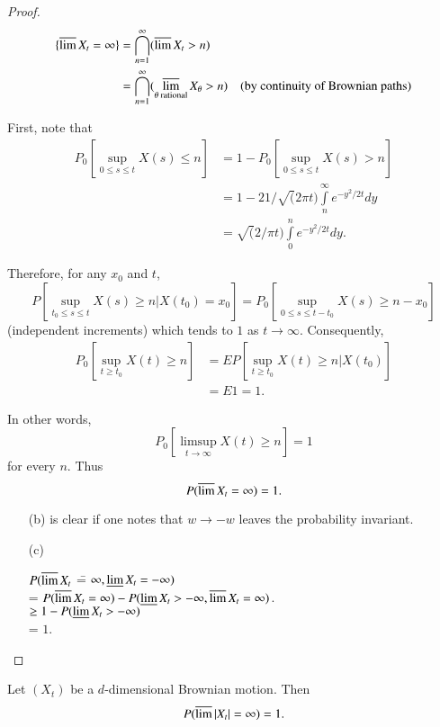 \begin{proof}
\begin{align*}
\{\varlimsup X_{t}=\infty\} &=
\bigcap\limits^{\infty}_{n=1}(\varlimsup X_{t}>n)\\
&= \bigcap\limits^{\infty}_{n=1}(\varlimsup_{\theta\text{~
    rational}}X_{\theta}>n)\quad \text{(by continuity of Brownian paths)}
\end{align*}

First, note that
\begin{align*}
P_{0}\left[\sup\limits_{0\leq s\leq t}X(s)\leq n\right] &=
1-P_{0}\left[\sup\limits_{0\leq s\leq t}X(s)>n\right]\\
&= 1-21/\surd(2\pi t)\int\limits^{\infty}_{n}e^{-y^{2}/2t}dy\\
&= \surd(2/\pi t)\int\limits^{n}_{0}e^{-y^{2}/2t}dy.
\end{align*}

Therefore, for any $x_{0}$ and $t$,
$$
P\left[\sup\limits_{t_{0}\leq s\leq t}X(s)\geq
  n|X(t_{0})=x_{0}\right]=P_{0}\left[\sup\limits_{0\leq s\leq
    t-t_{0}}X(s)\geq n-x_{0}\right]
$$
(independent increments) which tends to $1$ as $t\to
\infty$. Consequently,
\begin{align*}
P_{0}\left[\sup\limits_{t\geq t_{0}}X(t)\geq n\right] &=
EP\left[\sup\limits_{t\geq t_{0}}X(t)\geq n|X(t_{0})\right]\\
&= E1=1.
\end{align*}\pageoriginale

In other words,
$$
P_{0}\left[{\displaystyle{\mathop{\lim\sup}_{t\to \infty}}}X(t)\geq n\right]=1
$$
for every $n$. Thus
$$
P(\varlimsup X_{t}=\infty)=1.
$$
\begin{itemize}
\item[(b)] is clear if one notes that $w\to -w$ leaves the probability
invariant.

\item[(c)] \begin{tabbing}
 $P(\varlimsup X_{t}$ \== $\infty,\varliminf X_{t}=-\infty)$\\[4pt]
\>= $P(\varlimsup X_{t}=\infty)-P(\varliminf X_{t}>-\infty,\varlimsup
X_{t}=\infty)$.\\[4pt]
\>$\geq  1-P(\varliminf X_{t}>-\infty)$\\[4pt]
\>= $1$.
\end{tabbing}
\end{itemize}
\end{proof}

\begin{coro*}
Let $(X_{t})$ be a $d$-dimensional Brownian motion. Then 
$$
P(\varlimsup |X_{t}|=\infty)=1.
$$
\end{coro*}

